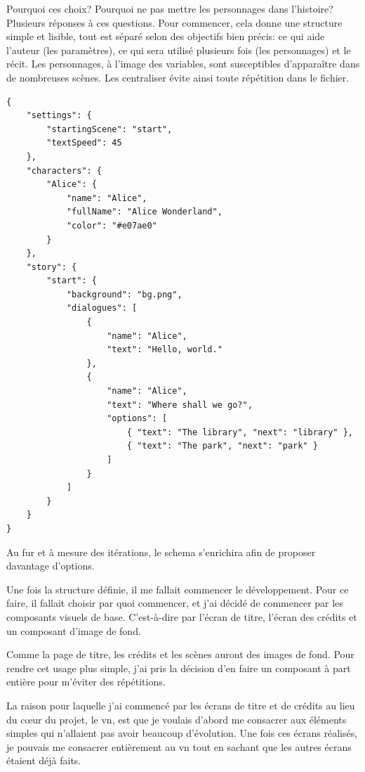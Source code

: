 Pourquoi ces choix? Pourquoi ne pas mettre les personnages dans l'histoire? Plusieurs réponses à ces questions. Pour commencer, cela donne une structure simple et lisible, tout est séparé selon des objectifs bien précis: ce qui aide l'auteur (les paramètres), ce qui sera utilisé plusieurs fois (les personnages) et le récit. Les personnages, à l'image des variables, sont susceptibles d'apparaître dans de nombreuses scènes. Les centraliser évite ainsi toute répétition dans le fichier. 

\begin{listing}[H]
\begin{verbatim}
{
    "settings": {
        "startingScene": "start",
        "textSpeed": 45
    },
    "characters": {
        "Alice": {
            "name": "Alice",
            "fullName": "Alice Wonderland",
            "color": "#e07ae0"
        }
    },
    "story": {
        "start": {
            "background": "bg.png",
            "dialogues": [
                {
                    "name": "Alice",
                    "text": "Hello, world."
                },
                {
                    "name": "Alice",
                    "text": "Where shall we go?",
                    "options": [
                        { "text": "The library", "next": "library" },
                        { "text": "The park", "next": "park" }
                    ]
                }
            ]
        }
    }
}
\end{verbatim}
\caption{Exemple de structure de fichier JSON (Auteur 2026)}
\label{lst:json_example}
\end{listing}

Au fur et à mesure des itérations, le \gls{schema} s'enrichira afin de proposer davantage d'options. 

Une fois la structure définie, il me fallait commencer le développement. Pour ce faire, il fallait choisir par quoi commencer, et j'ai décidé de commencer par les composants visuels de base. C'est-à-dire par l'écran de titre, l'écran des crédits et un composant d'image de fond.

Comme la page de titre, les crédits et les scènes auront des images de fond. Pour rendre cet usage plus simple, j'ai pris la décision d'en faire un composant à part entière pour m'éviter des répétitions.

La raison pour laquelle j'ai commencé par les écrans de titre et de crédits au lieu du c\oe{}ur du projet, le \gls{vn}, est que je voulais d'abord me consacrer aux éléments simples qui n'allaient pas avoir beaucoup d'évolution. Une fois ces écrans réalisés, je pouvais me consacrer entièrement au \gls{vn} tout en sachant que les autres écrans étaient déjà faits.

